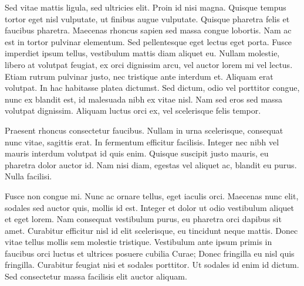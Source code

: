 



\maketitle

Sed vitae mattis ligula, sed ultricies elit. Proin id nisi magna. Quisque tempus tortor eget nisl vulputate, ut finibus augue vulputate. Quisque pharetra felis et faucibus pharetra. Maecenas rhoncus sapien sed massa congue lobortis. Nam ac est in tortor pulvinar elementum. Sed pellentesque eget lectus eget porta. Fusce imperdiet ipsum tellus, vestibulum mattis diam aliquet eu. Nullam molestie, libero at volutpat feugiat, ex orci dignissim arcu, vel auctor lorem mi vel lectus. Etiam rutrum pulvinar justo, nec tristique ante interdum et. Aliquam erat volutpat. In hac habitasse platea dictumst. Sed dictum, odio vel porttitor congue, nunc ex blandit est, id malesuada nibh ex vitae nisl. Nam sed eros sed massa volutpat dignissim. Aliquam luctus orci ex, vel scelerisque felis tempor.


Praesent rhoncus consectetur faucibus. Nullam in urna scelerisque, consequat nunc vitae, sagittis erat. In fermentum efficitur facilisis. Integer nec nibh vel mauris interdum volutpat id quis enim. Quisque suscipit justo mauris, eu pharetra dolor auctor id. Nam nisi diam, egestas vel aliquet ac, blandit eu purus. Nulla facilisi.

Fusce non congue mi. Nunc ac ornare tellus, eget iaculis orci. Maecenas nunc elit, sodales sed auctor quis, mollis id est. Integer et dolor ut odio vestibulum aliquet et eget lorem. Nam consequat vestibulum purus, eu pharetra orci dapibus sit amet. Curabitur efficitur nisl id elit scelerisque, eu tincidunt neque mattis. Donec vitae tellus mollis sem molestie tristique. Vestibulum ante ipsum primis in faucibus orci luctus et ultrices posuere cubilia Curae; Donec fringilla eu nisl quis fringilla. Curabitur feugiat nisi et sodales porttitor. Ut sodales id enim id dictum. Sed consectetur massa facilisis elit auctor aliquam.


